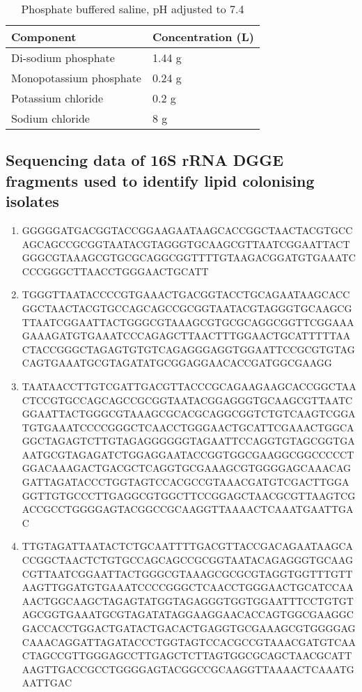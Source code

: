 \documentclass[11pt]{article}
\begin{document}
\begin{table}
\caption{Phosphate buffered saline, pH adjusted to 7.4}
\begin{tabular}{  p{6.9cm} | p{6.9cm}  }
\hline
Component & Concentration (L) \\
\hline
Di-sodium phosphate  & 1.44 g \\
  Monopotassium phosphate  & 0.24 g  \\
    Potassium chloride  &  0.2 g  \\
      Sodium chloride  & 8 g  \\
  \hline
\end{tabular}
\end{table}
\FloatBarrier
\subsection{Sequencing data of 16S rRNA DGGE fragments used to identify lipid colonising isolates}
\begin{enumerate}
\item GGGGGATGACGGTACCGGAAGAATAAGCACCGGCTAACTACGTGCCAGCAGCCGCGGTAATACGTAGGGTGCAAGCGTTAATCGGAATTACTGGGCGTAAAGCGTGCGCAGGCGGTTTTGTAAGACGGATGTGAAATCCCCGGGCTTAACCTGGGAACTGCATT
\item TGGGTTAATACCCCGTGAAACTGACGGTACCTGCAGAATAAGCACCGGCTAACTACGTGCCAGCAGCCGCGGTAATACGTAGGGTGCAAGCGTTAATCGGAATTACTGGGCGTAAAGCGTGCGCAGGCGGTTCGGAAAGAAAGATGTGAAATCCCAGAGCTTAACTTTGGAACTGCATTTTTAACTACCGGGCTAGAGTGTGTCAGAGGGAGGTGGAATTCCGCGTGTAGCAGTGAAATGCGTAGATATGCGGAGGAACACCGATGGCGAAGG
\item TAATAACCTTGTCGATTGACGTTACCCGCAGAAGAAGCACCGGCTAACTCCGTGCCAGCAGCCGCGGTAATACGGAGGGTGCAAGCGTTAATCGGAATTACTGGGCGTAAAGCGCACGCAGGCGGTCTGTCAAGTCGGATGTGAAATCCCCGGGCTCAACCTGGGAACTGCATTCGAAACTGGCAGGCTAGAGTCTTGTAGAGGGGGGTAGAATTCCAGGTGTAGCGGTGAAATGCGTAGAGATCTGGAGGAATACCGGTGGCGAAGGCGGCCCCCTGGACAAAGACTGACGCTCAGGTGCGAAAGCGTGGGGAGCAAACAGGATTAGATACCCTGGTAGTCCACGCCGTAAACGATGTCGACTTGGAGGTTGTGCCCTTGAGGCGTGGCTTCCGGAGCTAACGCGTTAAGTCGACCGCCTGGGGAGTACGGCCGCAAGGTTAAAACTCAAATGAATTGAC
\item TTGTAGATTAATACTCTGCAATTTTGACGTTACCGACAGAATAAGCACCGGCTAACTCTGTGCCAGCAGCCGCGGTAATACAGAGGGTGCAAGCGTTAATCGGAATTACTGGGCGTAAAGCGCGCGTAGGTGGTTTGTTAAGTTGGATGTGAAATCCCCGGGCTCAACCTGGGAACTGCATCCAAAACTGGCAAGCTAGAGTATGGTAGAGGGTGGTGGAATTTCCTGTGTAGCGGTGAAATGCGTAGATATAGGAAGGAACACCAGTGGCGAAGGCGACCACCTGGACTGATACTGACACTGAGGTGCGAAAGCGTGGGGAGCAAACAGGATTAGATACCCTGGTAGTCCACGCCGTAAACGATGTCAACTAGCCGTTGGGAGCCTTGAGCTCTTAGTGGCGCAGCTAACGCATTAAGTTGACCGCCTGGGGAGTACGGCCGCAAGGTTAAAACTCAAATGAATTGAC
\end{enumerate}
\end{document}
